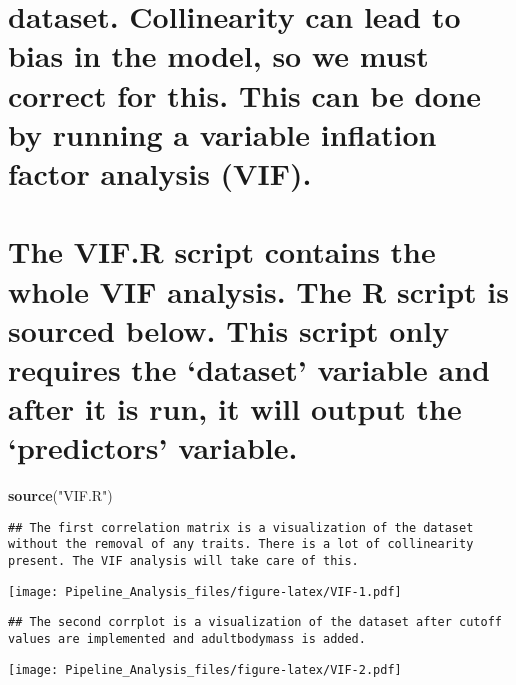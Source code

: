 \documentclass[
]{article}
\newenvironment{Shaded}{\begin{snugshade}}{\end{snugshade}}
\newcommand{\KeywordTok}[1]{\textcolor[rgb]{0.13,0.29,0.53}{\textbf{#1}}}
\newcommand{\NormalTok}[1]{#1}
\newcommand{\StringTok}[1]{\textcolor[rgb]{0.31,0.60,0.02}{#1}}
\begin{document}
\hypertarget{dataset.-collinearity-can-lead-to-bias-in-the-model-so-we-must-correct-for-this.-this-can-be-done-by-running-a-variable-inflation-factor-analysis-vif.}{%
\section{dataset. Collinearity can lead to bias in the model, so we must
correct for this. This can be done by running a variable inflation
factor analysis
(VIF).}\label{dataset.-collinearity-can-lead-to-bias-in-the-model-so-we-must-correct-for-this.-this-can-be-done-by-running-a-variable-inflation-factor-analysis-vif.}}

\hypertarget{the-vif.r-script-contains-the-whole-vif-analysis.-the-r-script-is-sourced-below.-this-script-only-requires-the-dataset-variable-and-after-it-is-run-it-will-output-the-predictors-variable.}{%
\section{The VIF.R script contains the whole VIF analysis. The R script
is sourced below. This script only requires the `dataset' variable and
after it is run, it will output the `predictors'
variable.}\label{the-vif.r-script-contains-the-whole-vif-analysis.-the-r-script-is-sourced-below.-this-script-only-requires-the-dataset-variable-and-after-it-is-run-it-will-output-the-predictors-variable.}}

\begin{Shaded}
\begin{Highlighting}[]
\KeywordTok{source}\NormalTok{(}\StringTok{"VIF.R"}\NormalTok{)}
\end{Highlighting}
\end{Shaded}

\begin{verbatim}
## The first correlation matrix is a visualization of the dataset without the removal of any traits. There is a lot of collinearity present. The VIF analysis will take care of this.
\end{verbatim}

\texttt{[image: Pipeline\_Analysis\_files/figure-latex/VIF-1.pdf]}

\begin{verbatim}
## The second corrplot is a visualization of the dataset after cutoff values are implemented and adultbodymass is added.
\end{verbatim}

\texttt{[image: Pipeline\_Analysis\_files/figure-latex/VIF-2.pdf]}
\end{document}
